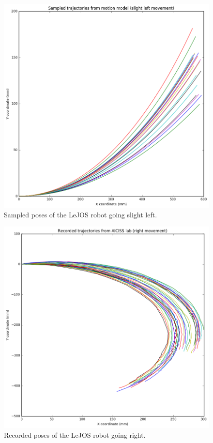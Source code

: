 \documentclass[paper=a4, fontsize=11pt]{scrartcl} %
\begin{document}
    \begin{figure}[h!]
        \begin{center}
            \setlength{\fboxsep}{0.5pt} %
            \setlength{\fboxrule}{0.5pt}
            \includegraphics[width=12cm,fbox]{images/sampled_poses_slightLeft.png}
            \caption{Sampled poses of the LeJOS robot going slight left.}
        \end{center}
    \end{figure}
    
    \begin{figure}[h!]
        \begin{center}
            \setlength{\fboxsep}{0.5pt} %
            \setlength{\fboxrule}{0.5pt}
            \includegraphics[width=12cm,fbox]{images/recorded_poses_right.png}
            \caption{Recorded poses of the LeJOS robot going right.}
        \end{center}
    \end{figure}
\end{document}
